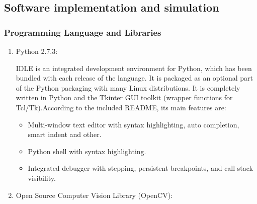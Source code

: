 \documentclass[12pt, a4paper]{article}
\begin{document}
\subsection{Software implementation and simulation}
\subsubsection{Programming Language and Libraries}
\begin{enumerate}
\item Python 2.7.3: 

IDLE is an integrated development environment for Python, which has been bundled with each release of the language. It is packaged as an optional part of the Python packaging
with many Linux distributions. It is completely written in Python and the Tkinter GUI
toolkit (wrapper functions for Tcl/Tk).According to the included README, its main
features are:
\begin{itemize}
\item Multi-window text editor with syntax highlighting, auto completion, smart indent
and other.
\item Python shell with syntax highlighting.
\item Integrated debugger with stepping, persistent breakpoints, and call stack visibility.
\end{itemize}
\item Open Source Computer Vision Library (OpenCV):


\end{enumerate}
\end{document}

